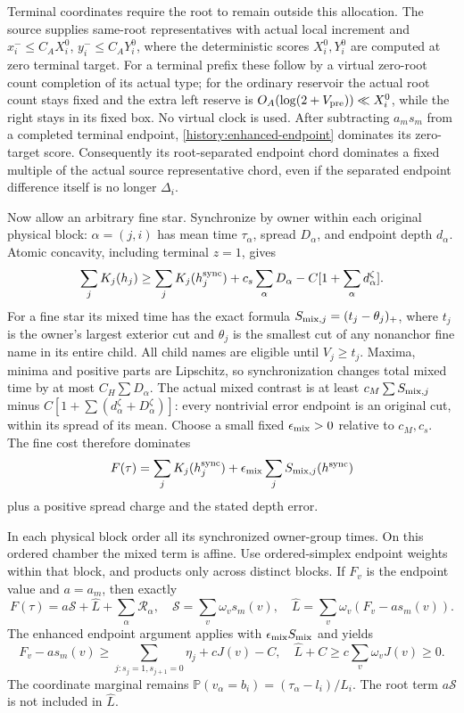 Terminal coordinates require the root to remain outside this allocation.
The source supplies same-root representatives with actual local
increment and
$x_i^-\le C_AX_i^0$, $y_i^-\le C_AY_i^0$, where the deterministic
scores $X_i^0,Y_i^0$ are computed at zero terminal target.
For a terminal prefix these follow by a virtual zero-root count
completion of its actual type; for the ordinary reservoir the actual
root count stays fixed and the extra left reserve is
$O_A(\log(2+V_{\rm pre}))\ll X_i^0$, while the right stays in its
fixed box. No virtual clock is used. After subtracting $a_ms_m$ from
a completed terminal endpoint, \eqref{history:enhanced-endpoint}
dominates its zero-target score. Consequently its root-separated
endpoint chord dominates a fixed multiple of the actual source
representative chord, even if the separated endpoint difference itself
is no longer $\Delta_i$.

Now allow an arbitrary fine star. Synchronize by owner within each
original physical block: $\alpha=(j,i)$ has mean time $\tau_\alpha$,
spread $D_\alpha$, and endpoint depth $d_\alpha$.
Atomic concavity, including terminal $z=1$, gives
\[
 \sum_jK_j(h_j)\ge\sum_jK_j(h_j^{\rm sync})
       +c_s\sum_\alpha D_\alpha
       -C[1+\sum_\alpha d_\alpha^\zeta].
\]
For a fine star its mixed time has the exact formula
$S_{{\rm mix},j}=(t_j-\theta_j)_+$, where $t_j$ is the owner's
largest exterior cut and $\theta_j$ is the smallest cut of any
nonanchor fine name in its entire child. All child names are eligible
until $V_j\ge t_j$. Maxima, minima and positive parts are Lipschitz,
so synchronization changes total mixed time by at most
$C_H\sum D_\alpha$. The actual mixed contrast is at least
$c_M\sum S_{{\rm mix},j}$ minus
$C[1+\sum(d_\alpha^\zeta+D_\alpha^\zeta)]$: every nontrivial
error endpoint is an original cut, within its spread of its mean.
Choose a small fixed $\epsilon_{\rm mix}>0$ relative to $c_M,c_s$.
The fine cost therefore dominates
\[
 F(\tau)=\sum_jK_j(h_j^{\rm sync})
                  +\epsilon_{\rm mix}\sum_jS_{{\rm mix},j}(h^{\rm sync})
\]
plus a positive spread charge and the stated depth error.

In each physical block order all its synchronized owner-group times.
On this ordered chamber the mixed term is affine. Use ordered-simplex
endpoint weights within that block, and products only across distinct
blocks. If $F_v$ is the endpoint value and $a=a_m$, then exactly
\begin{equation}
 F(\tau)=a\mathcal S+\widehat L+\sum_\alpha\mathcal R_\alpha,
 \quad\mathcal S=\sum_v\omega_vs_m(v),\quad
 \widehat L=\sum_v\omega_v(F_v-as_m(v)).
 \label{history:root-separated-interpolation}
\end{equation}
The enhanced endpoint argument applies with
$\epsilon_{\rm mix}S_{\rm mix}$ and yields
\[
 F_v-as_m(v)\ge
 \sum_{j:s_j=1,s_{j+1}=0}\eta_j+cJ(v)-C,
 \quad \widehat L+C\ge c\sum_v\omega_vJ(v)\ge0.
\]
The coordinate marginal remains
$\mathbb P(v_\alpha=b_i)=(\tau_\alpha-l_i)/L_i$.
The root term $a\mathcal S$ is not included in $\widehat L$.


